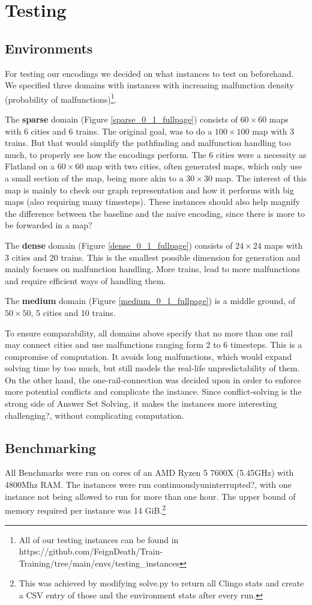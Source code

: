 \section{Testing}
\subsection{Environments}
For testing our encodings we decided on what instances to test on beforehand. We specified three domains with instances with increasing malfunction density (probability of malfunctions)\footnote{All of our testing instances can be found in https://github.com/FeignDeath/Train-Training/tree/main/envs/testing\_instances}. 

The \textbf{sparse} domain (Figure \ref{sparse_0_1_fullpage}) consists of $60\times60$ maps with 6 cities and 6 trains. The original goal, was to do a $100\times100$ map with 3 trains. But that would simplify the pathfinding and malfunction handling too much, to properly see how the encodings perform. The 6 cities were a necessity as Flatland on a $60\times60$ map with two cities, often generated maps, which only use a small section of the map, being more akin to a $30\times30$ map. The interest of this map is mainly to check our graph representation and how it performs with big maps (also requiring many timesteps). 
\color{red}  These instances should also help magnify the difference between the baseline and the naive encoding, since there is more to be forwarded in a map? \color{black}

The \textbf{dense} domain (Figure \ref{dense_0_1_fullpage}) consists of $24\times24$ maps with 3 cities and 20 trains. This is the smallest possible dimension for generation and mainly focuses on malfunction handling. More trains, lead to more malfunctions and require efficient ways of handling them.

The \textbf{medium} domain (Figure \ref{medium_0_1_fullpage}) is a middle ground, of $50\times50$, 5 cities and 10 trains.

To ensure comparability, all domains above specify that no more than one rail may connect cities and use malfunctions ranging form 2 to 6 timesteps. This is a compromise of computation. It avoids long malfunctions, which would expand solving time by too much, but still models the real-life unpredictability of them. On the other hand, the one-rail-connection was decided upon in order to enforce more potential conflicts and complicate the instance. Since conflict-solving is the strong side of Answer Set Solving, it makes the instances more interesting \color{red}challenging?\color{black}, without complicating computation.

\subsection{Benchmarking}
All Benchmarks were run on cores of an AMD Ryzen 5 7600X (5.45GHz) with 4800Mhz RAM. The instances were run continuously\color{red}uninterrupted?\color{black}, with one instance not being allowed to run for more than one hour. The upper bound of memory required per instance was 14 GiB.\footnote{This was achieved by modifying solve.py to return all Clingo stats and create a CSV entry of those and the environment stats after every run.}
